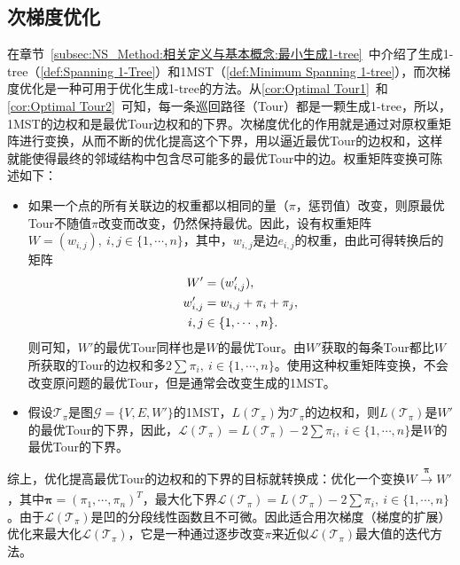 \subsection{次梯度优化}
\label{subsec:NS_Method:相关定义与基本概念:次梯度优化}
在章节~\ref{subsec:NS_Method:相关定义与基本概念:最小生成1-tree}~中介绍了生成1-tree（\autoref{def:Spanning 1-Tree}）和1MST（\autoref{def:Minimum Spanning 1-tree}），而次梯度优化\cite{held1971traveling}是一种可用于优化生成1-tree的方法。从\autoref{cor:Optimal Tour1}~和\autoref{cor:Optimal Tour2}~可知，每一条巡回路径（Tour）都是一颗生成1-tree，所以，1MST的边权和是最优Tour边权和的下界。次梯度优化的作用就是通过对原权重矩阵进行变换，从而不断的优化提高这个下界，用以逼近最优Tour的边权和，这样就能使得最终的邻域结构中包含尽可能多的最优Tour中的边。权重矩阵变换\cite{held1971traveling}可陈述如下：
\begin{itemize}
    \item 如果一个点的所有关联边的权重都以相同的量（$\pi$，惩罚值）改变，则原最优Tour不随值$\pi$改变而改变，仍然保持最优。因此，设有权重矩阵$W = (w_{i,j}), \ i,j \in \{ 1, \cdots, n\}$，其中，$w_{i,j}$是边$e_{i,j}$的权重，由此可得转换后的矩阵
    \begin{align}
        \label{eq:Pi权重矩阵}
        W' & = (w'_{i,j}), \\
        w'_{i,j} & = w_{i,j} + \pi_{i} + \pi_{j}, \notag \\
        i,j & \in \{ 1, \cdots, n\}. \notag
    \end{align}
    则可知，$W'$的最优Tour同样也是$W$的最优Tour。由$W'$获取的每条Tour都比$W$所获取的Tour的边权和多$2\sum \pi_i, \ i \in \{1, \cdots, n\}$。使用这种权重矩阵变换，不会改变原问题的最优Tour，但是通常会改变生成的1MST。
    \item 假设$\mathcal{T}_{\pi}$是图$\mathcal{G} = \{ V, E, W' \}$的1MST，$L(\mathcal{T}_{\pi})$为$\mathcal{T}_{\pi}$的边权和，则$L(\mathcal{T}_{\pi})$是$W'$的最优Tour的下界，因此，$\mathcal{L}(\mathcal{T}_{\pi}) = L(\mathcal{T}_{\pi}) - 2\sum \pi_i, \ i \in \{1, \cdots, n\}$是$W$的最优Tour的下界。
\end{itemize}
综上，优化提高最优Tour的边权和的下界的目标就转换成：优化一个变换$W \xrightarrow[]{\mathbf{\pi}} W'$，其中$\mathbf{\pi} = (\pi_1, \cdots, \pi_n)^T$，最大化下界$\mathcal{L}(\mathcal{T}_{\pi}) = L(\mathcal{T}_{\pi}) - 2\sum \pi_i, \ i \in \{1, \cdots, n\}$。由于$\mathcal{L}(\mathcal{T}_{\pi})$是凹的分段线性函数且不可微。因此适合用次梯度（梯度的扩展）优化来最大化$\mathcal{L}(\mathcal{T}_{\pi})$，它是一种通过逐步改变$\pi$来近似$\mathcal{L}(\mathcal{T}_{\pi})$最大值的迭代方法。
